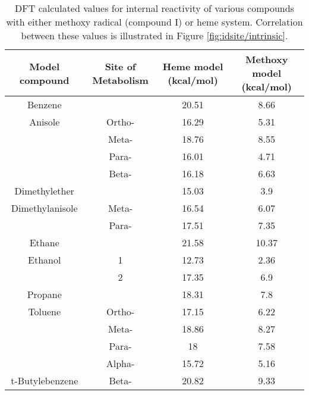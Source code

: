 \begin{table}[h]
\centering
\begin{tabular}{cccc}
\hline
Model compound & Site of Metabolism & Heme model (kcal/mol) & Methoxy model (kcal/mol) \\
\hline
Benzene &  & 20.51 & 8.66 \\
Anisole & Ortho- & 16.29 & 5.31 \\
 & Meta- & 18.76 & 8.55 \\
 & Para- & 16.01 & 4.71 \\
 & Beta- & 16.18 & 6.63 \\
Dimethylether &  & 15.03 & 3.9 \\
Dimethylanisole & Meta- & 16.54 & 6.07 \\
 & Para- & 17.51 & 7.35 \\
Ethane &  & 21.58 & 10.37 \\
Ethanol & 1 & 12.73 & 2.36 \\
 & 2 & 17.35 & 6.9 \\
Propane &  & 18.31 & 7.8 \\
Toluene & Ortho- & 17.15 & 6.22 \\
 & Meta- & 18.86 & 8.27 \\
 & Para- & 18 & 7.58 \\
 & Alpha- & 15.72 & 5.16 \\
t-Butylebenzene & Beta- & 20.82 & 9.33 \\
\hline
\end{tabular}
\caption{DFT calculated values for internal reactivity of various compounds with either methoxy radical (compound I) or heme system.
Correlation between these values is illustrated in Figure \ref{fig:idsite/intrinsic}.}
\label{table:heme_methoxy}
\end{table}
